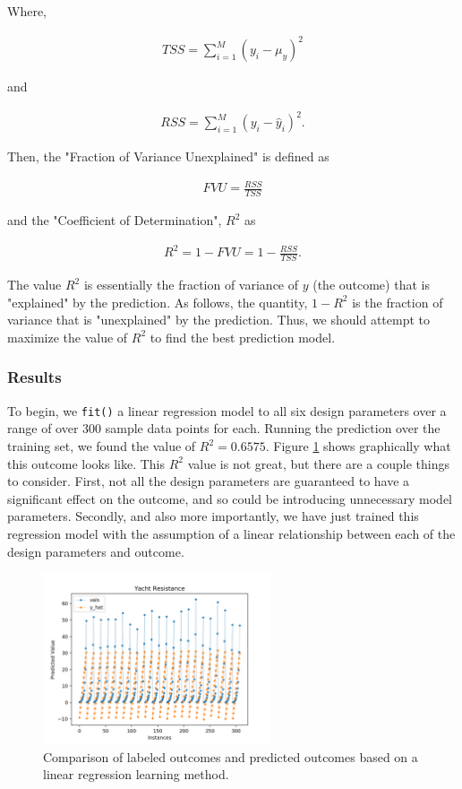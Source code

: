 \documentclass[11pt,a4paper]{article}
\begin{document}
Where,

\begin{align*}
TSS = \sum_{i=1}^M (y_i - \mu_y)^2
\end{align*}

and

\begin{align*}
RSS = \sum_{i=1}^M (y_i - \hat{y}_i)^2.
\end{align*}

Then, the "Fraction of Variance Unexplained" is defined as

\begin{align*}
FVU = \frac{RSS}{TSS}
\end{align*}

and the "Coefficient of Determination", $R^2$ as

\begin{align*}
R^2 = 1 - FVU = 1 - \frac{RSS}{TSS}.
\end{align*}

The value $R^2$ is essentially the fraction of variance of $y$ (the outcome) that is "explained" by the prediction. As follows, the quantity, $1-R^2$ is the fraction of variance that is "unexplained" by the prediction. Thus, we should attempt to maximize the value of $R^2$ to find the best prediction model.

\subsubsection{Results}
To begin, we \verb|fit()| a linear regression model to all six design parameters over a range of over 300 sample data points for each. Running the prediction over the training set, we found the value of $R^2 = 0.6575$. Figure \ref{fig:yacht} shows graphically what this outcome looks like. This $R^2$ value is not great, but there are a couple things to consider. First, not all the design parameters are guaranteed to have a significant effect on the outcome, and so could be introducing unnecessary model parameters. Secondly, and also more importantly, we have just trained this regression model with the assumption of a linear relationship between each of the design parameters and outcome.

\begin{figure}[ht]
\centering
\includegraphics[width=0.6\textwidth]{yacht}
\caption{Comparison of labeled outcomes and predicted outcomes based on a linear regression learning method.}
\label{fig:yacht}
\end{figure}
\end{document}
